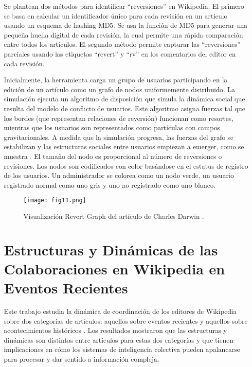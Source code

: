 Se plantean dos métodos para identificar “reversiones” en Wikipedia. El primero se basa en calcular un identificador único para cada revisión en un artículo usando un esquema de hashing MD5. Se usa la función de MD5 para generar una pequeña huella digital de cada revisión, la cual permite una rápida comparación entre todos los artículos. El segundo método permite capturar las “reversiones” parciales usando las etiquetas “revert” y “rv” en los comentarios del editor en cada revisión.

Inicialmente, la herramienta carga un grupo de usuarios participando en la edición de un artículo como un grafo de nodos uniformemente distribuido. La simulación ejecuta un algoritmo de disposición que simula la dinámica social que resulta del modelo de conflicto de usuarios. Este algoritmo asigna fuerzas tal que los bordes (que representan relaciones de reversión) funcionan como resortes, mientras que los usuarios son representados como partículas con campos gravitacionales. A medida que la simulación progresa, las fuerzas del grafo se estabilizan y las estructuras sociales entre usuarios empiezan a emerger, como se muestra . El tamaño del nodo es proporcional al número de reversiones o revisiones. Los nodos son codificados con color basándose en el estatus de registro de los usuarios. Un administrador se colorea como un nodo verde, un usuario registrado normal como uno gris y uno no registrado como uno blanco.

\begin{figure}[htp]
  \centering
  \texttt{[image: fig11.png]}
  \caption[Visualización Revert Graph del artículo de Charles Darwin]{Visualización Revert Graph del artículo de Charles Darwin \cite[Fig. 1]{Suh07}.}
  \label{fig:fig11}
\end{figure}

\section{Estructuras y Dinámicas de las Colaboraciones en Wikipedia en Eventos Recientes}
Este trabajo estudia la dinámica de coordinación de los editores de Wikipedia sobre dos categorías de artículos: aquellos sobre eventos recientes y aquellos sobre acontecimientos históricos \cite{Kee12}. Los resultados mostraron que las estructuras y dinámicas son distintas entre artículos para estas dos categorías y que tienen implicaciones en cómo los sistemas de inteligencia colectiva pueden apalancarse para procesar y dar sentido a información compleja.

